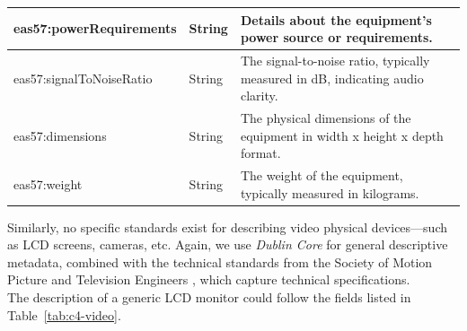 \begin{longtable}{|p{}|p{}|p{}|}
    \hline
    \scriptsize eas57:powerRequirements & \scriptsize String           & \scriptsize Details about the equipment's power source or requirements. \\
    \hline
    \scriptsize eas57:signalToNoiseRatio& \scriptsize String           & \scriptsize The signal-to-noise ratio, typically measured in dB, indicating audio clarity. \\
    \hline
    \scriptsize eas57:dimensions        & \scriptsize String           & \scriptsize The physical dimensions of the equipment in width x height x depth format. \\
    \hline
    \scriptsize eas57:weight            & \scriptsize String           & \scriptsize The weight of the equipment, typically measured in kilograms. \\
    \hline

\end{longtable}

Similarly, no specific standards exist for describing video physical devices—such as LCD screens, cameras, etc. Again, we use \textit{Dublin Core} for general descriptive metadata, combined with the technical standards from the Society of Motion Picture and Television Engineers \cite{SMPTE}, which capture technical specifications.\\
The description of a generic LCD monitor could follow the fields listed in Table~\ref{tab:c4-video}.

